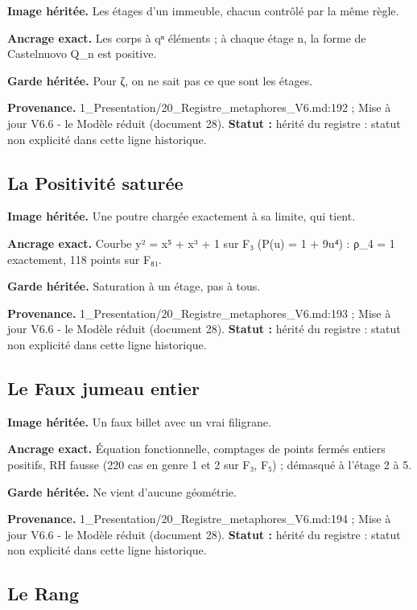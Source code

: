 \documentclass[
  9pt,
  a4paper,
]{article}
\begin{document}
\textbf{Image héritée.} Les étages d'un immeuble, chacun contrôlé par la
même règle.

\textbf{Ancrage exact.} Les corps à qⁿ éléments ; à chaque étage n, la
forme de Castelnuovo Q\_n est positive.

\textbf{Garde héritée.} Pour ζ, on ne sait pas ce que sont les étages.

\textbf{Provenance.} 1\_Presentation/20\_Registre\_metaphores\_V6.md:192
; Mise à jour V6.6 - le Modèle réduit (document 28). \textbf{Statut :}
hérité du registre : statut non explicité dans cette ligne historique.

\hypertarget{la-positivituxe9-saturuxe9e}{%
\subsection{La Positivité saturée}\label{la-positivituxe9-saturuxe9e}}

\textbf{Image héritée.} Une poutre chargée exactement à sa limite, qui
tient.

\textbf{Ancrage exact.} Courbe y² = x⁵ + x³ + 1 sur F₃ (P(u) = 1 + 9u⁴)
: ρ\_4 = 1 exactement, 118 points sur F₈₁.

\textbf{Garde héritée.} Saturation à un étage, pas à tous.

\textbf{Provenance.} 1\_Presentation/20\_Registre\_metaphores\_V6.md:193
; Mise à jour V6.6 - le Modèle réduit (document 28). \textbf{Statut :}
hérité du registre : statut non explicité dans cette ligne historique.

\hypertarget{le-faux-jumeau-entier}{%
\subsection{Le Faux jumeau entier}\label{le-faux-jumeau-entier}}

\textbf{Image héritée.} Un faux billet avec un vrai filigrane.

\textbf{Ancrage exact.} Équation fonctionnelle, comptages de points
fermés entiers positifs, RH fausse (220 cas en genre 1 et 2 sur F₃, F₅)
; démasqué à l'étage 2 à 5.

\textbf{Garde héritée.} Ne vient d'aucune géométrie.

\textbf{Provenance.} 1\_Presentation/20\_Registre\_metaphores\_V6.md:194
; Mise à jour V6.6 - le Modèle réduit (document 28). \textbf{Statut :}
hérité du registre : statut non explicité dans cette ligne historique.

\hypertarget{le-rang}{%
\subsection{Le Rang}\label{le-rang}}
\end{document}

